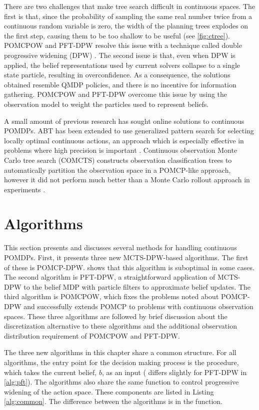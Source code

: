 There are two challenges that make tree search difficult in continuous spaces.
The first is that, since the probability of sampling the same real number twice from a continuous random variable is zero, the width of the planning trees explodes on the first step, causing them to be too shallow to be useful (see \cref{fig:ctree}).
POMCPOW and PFT-DPW resolve this issue with a technique called double progressive widening (DPW) \cite{couetoux2011double}. 
The second issue is that, even when DPW is applied, the belief representations used by current solvers collapse to a single state particle, resulting in overconfidence.
As a consequence, the solutions obtained resemble QMDP policies, and there is no incentive for information gathering.
POMCPOW and PFT-DPW overcome this issue by using the observation model to weight the particles used to represent beliefs.

A small amount of previous research has sought online solutions to continuous POMDPs.
ABT has been extended to use generalized pattern search for selecting locally optimal continuous actions, an approach which is especially effective in problems where high precision is important \cite{seiler2015online}.
Continuous observation Monte Carlo tree search (COMCTS) constructs observation classification trees to automatically partition the observation space in a POMCP-like approach, however it did not perform much better than a Monte Carlo rollout approach in experiments \cite{pas2012simulation}.

\section{Algorithms}

This section presents and discusses several methods for handling continuous POMDPs.
First, it presents three new MCTS-DPW-based algorithms.
The first of these is POMCP-DPW.
 shows that this algorithm is suboptimal in some cases.
The second algorithm is PFT-DPW, a straightforward application of MCTS-DPW to the belief MDP with particle filters to approximate belief updates.
The third algorithm is POMCPOW, which fixes the problems noted about POMCP-DPW and successfully extends POMCP to problems with continuous observation spaces.
These three algorithms are followed by brief discussion about the discretization alternative to these algorithms and the additional observation distribution requirement of POMCPOW and PFT-DPW.

The three new algorithms in this chapter share a common structure.
For all algorithms, the entry point for the decision making process is the  procedure, which takes the current belief, $b$, as an input ( differs slightly for PFT-DPW in \cref{alg:pft}).
The algorithms also share the same  function to control progressive widening of the action space.
These components are listed in Listing \ref{alg:common}.
The difference between the algorithms is in the  function.

